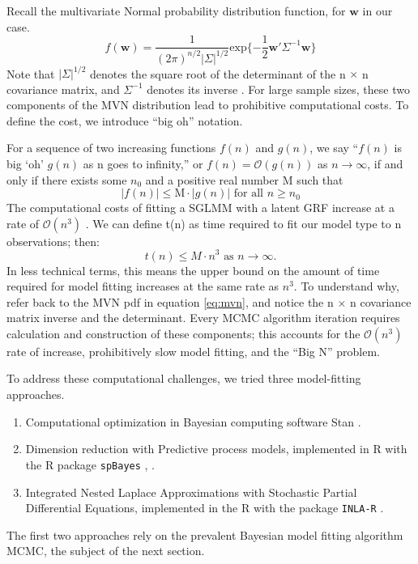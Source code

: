 Recall the multivariate Normal probability distribution function, for $\pmb{w}$ in our case.
\begin{equation} \label{eq:mvn}
f(\pmb{w}) = \frac{1}{(2\pi)^{n/2}|\Sigma|^{1/2}} \text{exp}\{ -\frac{1}{2}\pmb{w}'\Sigma^{-1}\pmb{w} \}
\end{equation}
Note that $|\Sigma|^{1/2}$ denotes the square root of the determinant of the n $\times$ n covariance matrix, and $\Sigma^{-1}$ denotes its inverse \citep{Lay}. For large sample sizes, these two components of the MVN distribution lead to prohibitive computational costs. To define the cost, we introduce ``big oh'' notation. 

For a sequence of two increasing functions $f(n)$ and $g(n)$, we say ``$f(n)$ is big `oh' $g(n)$ as n goes to infinity,'' or $f(n) = \mathcal{O}(g(n))$ as $n \rightarrow \infty$, if and only if there exists some $n_{0}$ and a positive real number M such that
  $$|f(n)| \leq \text{M} \cdot |g(n)| \text{ for all } n \geq n_0 $$
The computational costs of fitting a SGLMM with a latent GRF increase at a rate of $\mathcal{O}(n^{3})$ \citep{Finley2009}. We can define t(n) as time required to fit our model type to n observations; then:
$$t(n) \leq M \cdot n^{3} \text{ as } n \rightarrow \infty.$$
In less technical terms, this means the upper bound on the amount of time required for model fitting increases at the same rate as $n^{3}$. To understand why, refer back to the MVN pdf in equation \ref{eq:mvn}, and notice the n $\times$ n covariance matrix inverse and the determinant. Every MCMC algorithm iteration requires calculation and construction of these components; this accounts for the $\mathcal{O}(n^{3})$ rate of increase, prohibitively slow model fitting, and the ``Big N'' problem. 

To address these computational challenges, we tried three model-fitting approaches.
\begin{enumerate}
\item Computational optimization in Bayesian computing software Stan \citep{rstan}.
\item Dimension reduction with Predictive process models, implemented in R with the R package \verb|spBayes| \citep{Eidsvik2012}, \citep{Finley2013}.
\item Integrated Nested Laplace Approximations with Stochastic Partial Differential Equations, implemented in the R with the package \verb|INLA-R| \citep{Lindgren2015}.
\end{enumerate}
The first two approaches rely on the prevalent Bayesian model fitting algorithm  MCMC, the subject of the next section.

